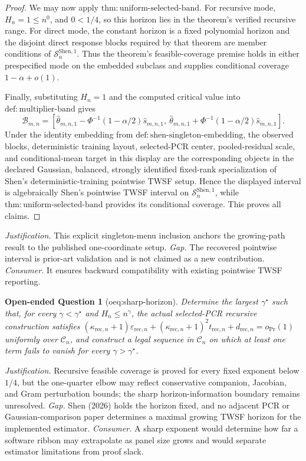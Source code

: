 \documentclass{article}
\newtheorem{openendedquestion}{Open-ended Question}
\begin{document}
\begin{proof}
We may now apply \(\mathrm{thm{:}uniform\mbox{-}selected\mbox{-}band}\).  For recursive mode, \(H_n=1\leq n^0\), and \(0<1/4\), so this horizon lies in the theorem's verified recursive range.  For direct mode, the constant horizon is a fixed polynomial horizon and the disjoint direct response blocks required by that theorem are member conditions of \(\mathcal S_n^{\mathrm{Shen},1}\).  Thus the theorem's feasible-coverage premise holds in either prespecified mode on the embedded subclass and supplies conditional coverage \(1-\alpha+o(1)\).

Finally, substituting \(H_n=1\) and the computed critical value into \(\mathrm{def{:}multiplier\mbox{-}band}\) gives
\[
 \mathcal B_{m,n}
 =\left[
 \widehat\theta_{m,n,1}
 -\Phi^{-1}(1-\alpha/2)\widehat s_{m,n,1},
 \ \widehat\theta_{m,n,1}
 +\Phi^{-1}(1-\alpha/2)\widehat s_{m,n,1}
 \right].
\]
Under the identity embedding from \(\mathrm{def{:}shen\mbox{-}singleton\mbox{-}embedding}\), the observed blocks, deterministic training layout, selected-PCR center, pooled-residual scale, and conditional-mean target in this display are the corresponding objects in the declared Gaussian, balanced, strongly identified fixed-rank specialization of Shen's deterministic-training pointwise TWSF setup.  Hence the displayed interval is algebraically Shen's pointwise TWSF interval on \(\mathcal S_n^{\mathrm{Shen},1}\), while \(\mathrm{thm{:}uniform\mbox{-}selected\mbox{-}band}\) provides its conditional coverage.  This proves all claims.
\end{proof}
\par\smallskip\noindent \textit{Justification.} This explicit singleton-menu inclusion anchors the growing-path result to the published one-coordinate setup. \textit{Gap.} The recovered pointwise interval is prior-art validation and is not claimed as a new contribution. \textit{Consumer.} It ensures backward compatibility with existing pointwise TWSF reporting.

\begin{openendedquestion}[oeq:sharp-horizon]\label{oeq:sharp-horizon}
Determine the largest \(\gamma^{\star}\) such that, for every \(\gamma<\gamma^{\star}\) and \(H_n\le n^\gamma\), the actual selected-PCR recursive construction satisfies \((\kappa_{\mathrm{rec},n}+1)\varepsilon_{\mathrm{rec},n}+(\kappa_{\mathrm{rec},n}+1)^2t_{\mathrm{rec},n}+d_{\mathrm{rec},n}=o_{\Pr}(1)\) uniformly over \(\mathcal C_n\), and construct a legal sequence in \(\mathcal C_n\) on which at least one term fails to vanish for every \(\gamma>\gamma^{\star}\).
\end{openendedquestion}
\par\smallskip\noindent \textit{Justification.} Recursive feasible coverage is proved for every fixed exponent below \(1/4\), but the one-quarter elbow may reflect conservative companion, Jacobian, and Gram perturbation bounds; the sharp horizon-information boundary remains unresolved. \textit{Gap.} Shen (2026) holds the horizon fixed, and no adjacent PCR or Gaussian-comparison paper determines a maximal growing TWSF horizon for the implemented estimator. \textit{Consumer.} A sharp exponent would determine how far a software ribbon may extrapolate as panel size grows and would separate estimator limitations from proof slack.
\end{document}
